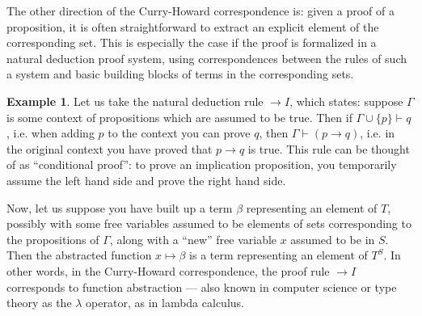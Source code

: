 \documentclass{article}
\theoremstyle{definition}
\newtheorem{example}{Example}
\begin{document}
	The other direction of the Curry-Howard correspondence is: given a proof of a proposition, it is often straightforward to extract an explicit element of the corresponding set.  This is especially the case if the proof is formalized in a natural deduction proof system, using correspondences between the rules of such a system and basic building blocks of terms in the corresponding sets.
	
	\begin{example}
		Let us take the natural deduction rule ${\rightarrow} I$, which states: suppose $\Gamma$ is some context of propositions which are assumed to be true.  Then if $\Gamma \cup \{ p \} \vdash q$, i.e. when adding $p$ to the context you can prove $q$, then $\Gamma \vdash (p \rightarrow q)$, i.e. in the original context you have proved that $p \rightarrow q$ is true.  This rule can be thought of as ``conditional proof'': to prove an implication proposition, you temporarily assume the left hand side and prove the right hand side.
	
	Now, let us suppose you have built up a term $\beta$ representing an element of $T$, possibly with some free variables assumed to be elements of sets corresponding to the propositions of $\Gamma$, along with a ``new'' free variable $x$ assumed to be in $S$.  Then the abstracted function $x \mapsto \beta$ is a term representing an element of $T^S$.  In other words, in the Curry-Howard correspondence, the proof rule ${\rightarrow} I$ corresponds to function abstraction --- also known in computer science or type theory as the $\lambda$ operator, as in lambda calculus.
	\end{example}
\end{document}
